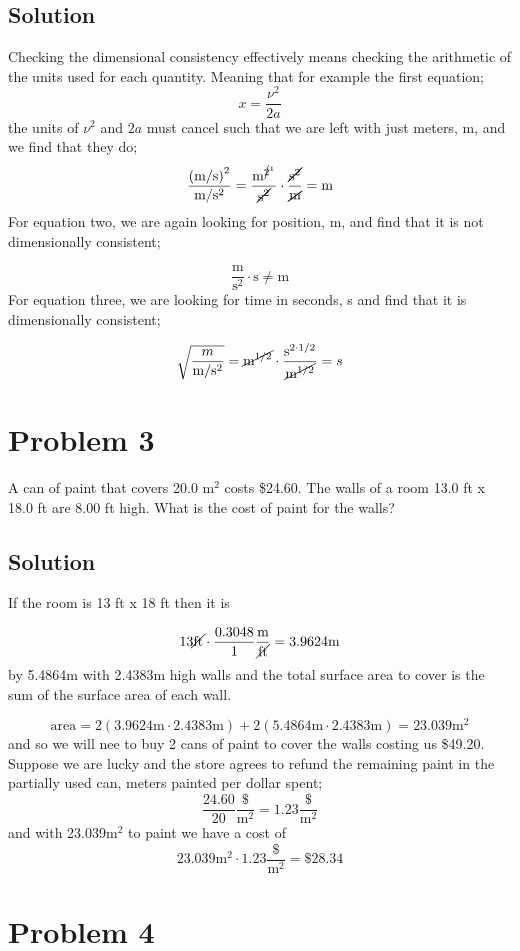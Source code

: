 \documentclass{article}
\newcommand{\meter}{\text{m}}
\newcommand{\second}{\text{s}}
\newcommand{\foot}{\text{ft}}
\begin{document}
\subsection*{Solution}
Checking the dimensional consistency effectively means checking the arithmetic of the units used for each quantity. Meaning that for example the first equation;
\[
	x = \frac{\nu^2}{2a}
\]
the units of $\nu^2$ and $2a$ must cancel such that we are left with just meters, $\meter$, and we find that they do;
\[
	\frac{\left( \meter/\second \right)^2}{\meter/\second^2} = \frac{\meter^{\cancel{2}^1}}{\cancel{\second^2}} \cdot \frac{\cancel{\second^2}}{\cancel{\meter}} = \meter
\]
For equation two, we are again looking for position, m, and find that it is not dimensionally consistent;

\[
	\frac{\meter}{\second^2} \cdot \second \ne \meter
\]
For equation three, we are looking for time in seconds, s and find that it is dimensionally consistent;

\[
	\sqrt{\frac{m}{\meter/\second^2}} = \cancel{\meter^{1/2}} \cdot \frac{\second^{2 \cdot 1/2}}{\cancel{\meter^{1/2}}} = s
\]

\section*{Problem 3}
A can of paint that covers 20.0 m$^2$ costs \$24.60. The walls of a room 13.0 ft x 18.0 ft are
8.00 ft high. What is the cost of paint for the walls?

\subsection*{Solution}
If the room is 13 ft x 18 ft then it is

\[
	13\cancel{\foot} \cdot \frac{0.3048}{1} \frac{\meter}{\cancel{\foot}} = 3.9624 \meter
\]
by 5.4864m with 2.4383m high walls and the total surface area to cover is the sum of the surface area of each wall.

\[
	\text{area} = 2\left( 3.9624 \meter \cdot 2.4383 \meter \right) + 2 \left( 5.4864 \meter \cdot 2.4383 \meter \right) = 23.039 \meter^2
\]
and so we will nee to buy 2 cans of paint to cover the walls costing us \$49.20. Suppose we are lucky and the store agrees to refund the remaining paint in the partially used can, meters painted per dollar spent;
\[
	\frac{24.60}{20} \frac{\$}{\meter^2} = 1.23 \frac{\$}{\meter^2}
\]
and with 23.039m$^2$ to paint we have a cost of
\[
	23.039 \meter^2 \cdot 1.23 \frac{\$}{\meter^2} = \$28.34
\]

\section*{Problem 4}
\end{document}

